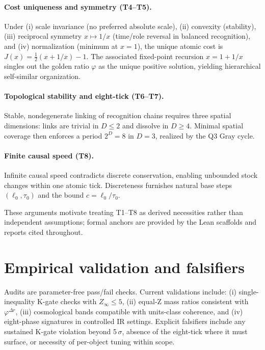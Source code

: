 \documentclass[11pt]{article}
\begin{document}
\paragraph{Cost uniqueness and symmetry (T4--T5).} Under (i) scale invariance (no preferred absolute scale), (ii) convexity (stability), (iii) reciprocal symmetry \(x\mapsto 1/x\) (time/role reversal in balanced recognition), and (iv) normalization (minimum at \(x=1\)), the unique atomic cost is \(J(x)=\tfrac{1}{2}(x+1/x)-1\). The associated fixed-point recursion \(x=1+1/x\) singles out the golden ratio \(\varphi\) as the unique positive solution, yielding hierarchical self\mbox{-}similar organization.

\paragraph{Topological stability and eight\mbox{-}tick (T6--T7).} Stable, nondegenerate linking of recognition chains requires three spatial dimensions: links are trivial in \(D\le 2\) and dissolve in \(D\ge 4\). Minimal spatial coverage then enforces a period \(2^D=8\) in \(D=3\), realized by the Q3 Gray cycle.

\paragraph{Finite causal speed (T8).} Infinite causal speed contradicts discrete conservation, enabling unbounded stock changes within one atomic tick. Discreteness furnishes natural base steps \((\ell_0,\tau_0)\) and the bound \(c=\ell_0/\tau_0\).

These arguments motivate treating T1--T8 as derived necessities rather than independent assumptions; formal anchors are provided by the Lean scaffolds and reports cited throughout.

\section{Empirical validation and falsifiers}\label{sec:empirical}
Audits are parameter\mbox{-}free pass/fail checks. Current validations include: (i) single\mbox{-}inequality K\mbox{-}gate checks with \(Z_\infty\le 5\), (ii) equal\mbox{-}Z mass ratios consistent with \(\varphi^{\Delta r}\), (iii) cosmological bands compatible with units\mbox{-}class coherence, and (iv) eight\mbox{-}phase signatures in controlled IR settings. Explicit falsifiers include any sustained K\mbox{-}gate violation beyond 5\,\(\sigma\), absence of the eight\mbox{-}tick where it must surface, or necessity of per\mbox{-}object tuning within scope.
\end{document}
